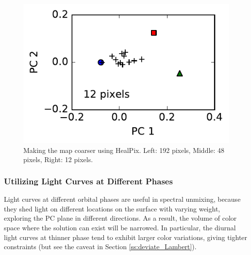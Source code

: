 \documentclass[iop,numberedappendix,apj]{emulateapj}
\begin{document}
\begin{figure}[hbt!]
\begin{minipage}{0.33\hsize}
\begin{center}
\includegraphics[width=\hsize]{IGBP_PCplane_Nside0.pdf}
    \end{center}
     \end{minipage}
    \caption{Making the map coarser using HealPix. Left: 192 pixels, Middle: 48 pixels, Right: 12 pixels. }
\label{fig:lowresolution}
\end{figure}


\subsubsection{Utilizing Light Curves at Different Phases}



Light curves at different orbital phases are useful in spectral unmixing, because they shed light on different locations on the surface with varying weight, exploring the PC plane in different directions. 
As a result, the volume of color space where the solution can exist will be narrowed.  
In particular, the diurnal light curves at thinner phase tend to exhibit larger color variations, giving tighter constraints (but see the caveat in Section \ref{ss:deviate_Lambert}). 
\end{document}
